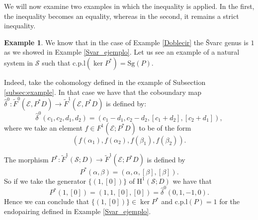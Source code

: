 \documentclass[12pt,reqno]{amsart}
\theoremstyle{definition}
\newtheorem{example}[teo]{Example}
\theoremstyle{remark}
\numberwithin{figure}{section}%
\newcommand{\Si}{\mathcal{S}}
\newcommand{\Ho}{\mathrm{H}}
\newcommand{\E}{\mathcal{E}}
\newcommand{\sG}{\mathrm{Sg}}
\newcommand{\cpl}{\mathrm{c.p.l}}
\begin{document}
We will now examine two examples in which the inequality is applied. In the first, the inequality becomes an equality, whereas in the second, it remains a strict inequality.

\begin{example}
    We know that in the case of Example 
    \ref{Doblecir} the \v{S}varc genus is $1$ as we showed in Example \ref{Svar_ejemplo}. Let us see an example of a natural system in $\Si$ such that $\cpl (\ker P^*)=\sG(P)$. 
    
    Indeed, take the cohomology defined in the example
    of Subsection \ref{subsec:example}. In that case we have that the  coboundary map $\hat{\delta}^0 \colon \tilde{F}^0(\E,P^*D) \rightarrow \tilde{F}^1(\E,P^*D)$ is defined by:
    $$
    \hat{\delta}^0(c_1,c_2,d_1,d_2)=(c_1-d_1,c_2-d_2,[c_1+d_2],[c_2+d_1]),
    $$ where we take an element $f \in F^1(\E ; P^*D)$ to be of the form $$(f(\alpha_1),f(\alpha_2),f(\beta_1),f(\beta_2)).$$
    
    The morphism $P^* \colon \tilde F^1(\Si;D) \rightarrow \tilde F^1(\E ; P^*D)$ is defined by $$P^*(\alpha,\beta)=(\alpha,\alpha,[\beta],[\beta]).$$ So if we take the generator $\{(1,[0])\}$ of $\Ho^1(\Si;D)$ we have that $$P^*(1,[0])=(1,1,[0],[0])=\hat{\delta}^0(0,1,-1,0).$$ Hence we can conclude that $\{(1,[0])\} \in \ker P^*$ and $\mathrm{c.p.l} (P)=1$ for the endopairing defined in Example \ref{Svar_ejemplo}.
\end{example}
\end{document}
